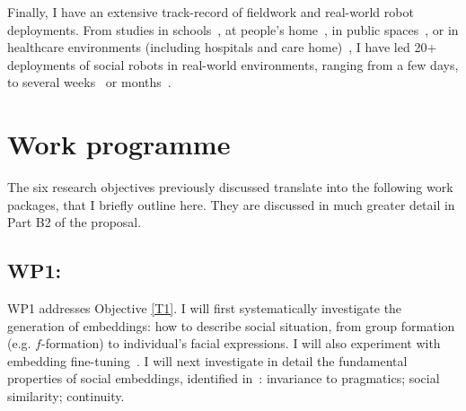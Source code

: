 Finally, I have an extensive track-record of fieldwork and real-world robot
deployments. From studies in schools~\autocite{hood2015when,
lemaignan2016learning, jacq2016building,
baxter2015wider,kennedy2016cautious,senft2018robots,lemaignan2022social}, at
people's home~\autocite{mondada2015ranger}, in public
spaces~\autocite{alhafnawi2022deliberative}, or in healthcare environments
(including hospitals and care
home)~\autocite{winkle2020couch,cooper2023challenges}, I have led 20+
deployments of social robots in real-world environments, ranging from a few
days, to several weeks~\autocite{jacq2016building,lemaignan2022social} or
months~\autocite{winkle2020couch}.



\section{Work programme}


The six research objectives previously discussed translate into the following
work packages, that I briefly outline here. They are discussed in much greater detail in Part B2 of the proposal.

\subsection{WP1: \textbf{\wpOne}}

WP1 addresses Objective \ref{T1}. I will first systematically investigate the
generation of embeddings: how to describe social situation, from group formation
(e.g. $f$-formation) to individual's facial expressions. I will also experiment
with embedding fine-tuning~\cite{hadsell2006dimensionality}. I will next
investigate in detail the fundamental properties of social embeddings,
identified in~\cite{lemaignan2024social}: invariance to pragmatics; social
similarity; continuity.

